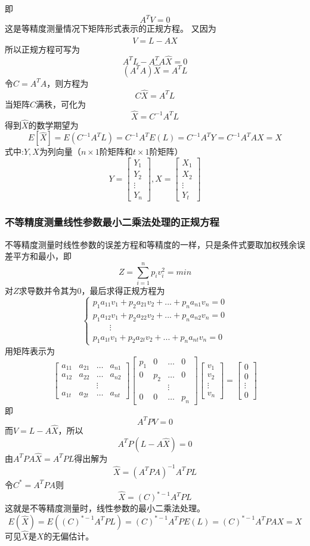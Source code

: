 即\[ A^TV=0 \]
这是等精度测量情况下矩阵形式表示的正规方程。
又因为\[ V=L-A\hat{X} \]
所以正规方程可写为\[ A^TL-A^TA\hat{X}=0 \]\[ (A^TA)\hat{X}=A^TL \]
令$ C=A^TA $，则方程为\[ C\hat{X}=A^TL \]
当矩阵$ C $满秩，可化为\[ \hat{X}=C^{-1}A^TL \]
得到$ \hat{X} $的数学期望为\[ E[\hat{X}]=E(C^{-1}A^TL)=C^{-1}A^TE(L)=C^{-1}A^TY=C^{-1}A^TAX=X \]
式中:$ Y,X $为列向量（$ n\times1 $阶矩阵和$ t\times1 $阶矩阵）
\[ Y=\begin{bmatrix}
	Y_1\\Y_2\\\vdots\\Y_n
\end{bmatrix},X=\begin{bmatrix}
	X_1\\X_2\\\vdots\\Y_t
\end{bmatrix} \]
\subsubsection{不等精度测量线性参数最小二乘法处理的正规方程}
不等精度测量时线性参数的误差方程和等精度的一样，只是条件式要取加权残余误差平方和最小，即\[ Z=\sum_{i=1}^{n}p_iv_i^2=min \]
对$ Z $求导数并令其为0，最后求得正规方程为\[ \begin{cases}
	p_1a_{11}v_1+p_2a_{21}v_2+...+p_na_{n1}v_n=0\\
	p_1a_{12}v_1+p_2a_{22}v_2+...+p_na_{n2}v_n=0\\
	\qquad \vdots\\
	p_1a_{1t}v_1+p_2a_{2t}v_2+...+p_na_{nt}v_n=0
\end{cases} \]
用矩阵表示为\[ \begin{bmatrix}
	a_{11}&a_{21}&\dots&a_{n1}\\
	a_{12}&a_{22}&\dots&a_{n2}\\
	& 	 &\vdots\\
	a_{1t}&a_{2t}&\dots&a_{nt}
\end{bmatrix}\begin{bmatrix}
	p_1	&	0	&	\dots&	0\\
	0	&	p_2	&	\dots&	0\\
	& 	 &\vdots\\
	0	&	0	&	\dots&	p_n
\end{bmatrix}\begin{bmatrix}
	v_1\\v_2\\\vdots\\v_n
\end{bmatrix}=\begin{bmatrix}
	0\\0\\\vdots\\0
\end{bmatrix} \]
即\[ A^TPV=0 \]
而$ V=L-A\hat{X} $，所以\[ A^TP(L-A\hat{X})=0 \]
由$ A^TPA\hat{X}=A^TPL $得出解为\[ \hat{X}=(A^TPA)^{-1}A^TPL \]
令$ C^*=A^TPA $则\[ \hat{X}=(C)^{*-1}A^TPL \]
这就是不等精度测量时，线性参数的最小二乘法处理。
\[ E(\hat{X})=E((C)^{*-1}A^TPL)=(C)^{*-1}A^TPE(L)=(C)^{*-1}A^TPAX=X \]
可见$ \hat{X} $是$ X $的无偏估计。
